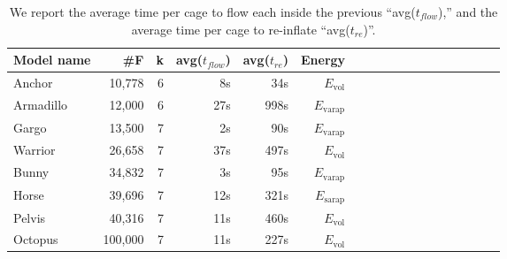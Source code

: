 \begin{table}
\centering
{}
\setlength{\tabcolsep}{5.5pt}
\begin{tabular}{l r r r r r r r r r r r r r r r r r}
\rowcolor{white}
Model name  & \#F & k & avg($t_{flow}$) & avg($t_{re}$) & Energy\\
\midrule
Anchor & 10,778 & 6 & 8s & 34s & $E_\text{vol}$ \\
Armadillo & 12,000 & 6 & 27s & 998s & $E_\text{varap}$ \\
Gargo & 13,500 & 7 & 2s & 90s & $E_\text{varap}$\\
Warrior & 26,658 & 7 & 37s & 497s & $E_\text{vol}$  \\
Bunny & 34,832 & 7 & 3s & 95s & $E_\text{varap}$ \\
Horse & 39,696 & 7 & 12s & 321s & $E_\text{sarap}$ \\
Pelvis & 40,316 & 7 & 11s & 460s & $E_\text{vol}$  \\
Octopus & 100,000 & 7 & 11s & 227s & $E_\text{vol}$ \\
\bottomrule
\end{tabular}
\caption{
We report the average time per cage to flow each inside the 
previous ``avg($t_{flow}$),'' and the average time per cage to re-inflate
``avg($t_{re}$)''.}
\label{tab:timings}
\end{table}
